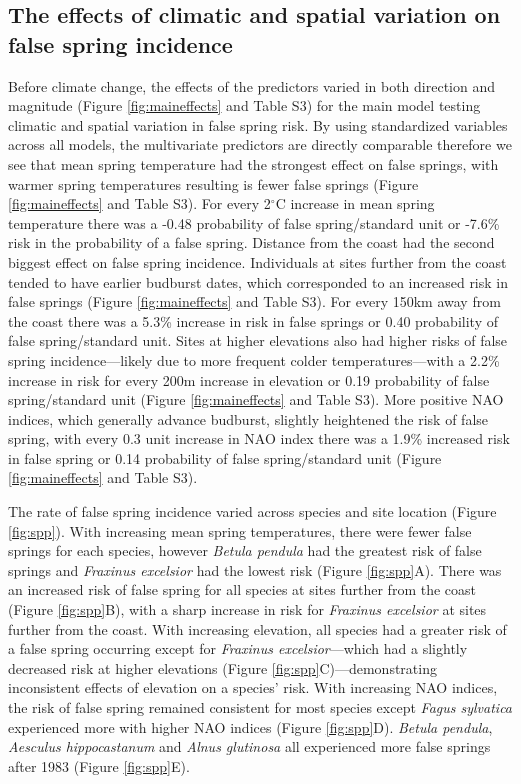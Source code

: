 \documentclass{article}\usepackage[]{graphicx}\usepackage[]{color}
\begin{document}
\subsection*{The effects of climatic and spatial variation on false spring incidence}
Before climate change, the effects of the predictors varied in both direction and magnitude (Figure \ref{fig:maineffects} and Table S3) for the main model testing climatic and spatial variation in false spring risk. By using standardized variables across all models, the multivariate predictors are directly comparable therefore we see that mean spring temperature had the strongest effect on false springs, with warmer spring temperatures resulting is fewer false springs (Figure \ref{fig:maineffects} and Table S3). For every 2$^{\circ}$C increase in mean spring temperature there was a -0.48 probability of false spring/standard unit or -7.6\% risk in the probability of a false spring. Distance from the coast had the second biggest effect on false spring incidence. Individuals at sites further from the coast tended to have earlier budburst dates, which corresponded to an increased risk in false springs (Figure \ref{fig:maineffects} and Table S3). For every 150km away from the coast there was a 5.3\% increase in risk in false springs or 0.40 probability of false spring/standard unit. Sites at higher elevations also had higher risks of false spring incidence---likely due to more frequent colder temperatures---with a 2.2\% increase in risk for every 200m increase in elevation or 0.19 probability of false spring/standard unit (Figure \ref{fig:maineffects} and Table S3). More positive NAO indices, which generally advance budburst, slightly heightened the risk of false spring, with every 0.3 unit increase in NAO index there was a 1.9\% increased risk in false spring or 0.14 probability of false spring/standard unit (Figure \ref{fig:maineffects} and Table S3).  

The rate of false spring incidence varied across species and site location (Figure \ref{fig:spp}). With increasing mean spring temperatures, there were fewer false springs for each species, however \textit{Betula pendula} had the greatest risk of false springs and \textit{Fraxinus excelsior} had the lowest risk (Figure \ref{fig:spp}A). There was an increased risk of false spring for all species at sites further from the coast (Figure \ref{fig:spp}B), with a sharp increase in risk for \textit{Fraxinus excelsior} at sites further from the coast. With increasing elevation, all species had a greater risk of a false spring occurring except for \textit{Fraxinus excelsior}---which had a slightly decreased risk at higher elevations (Figure \ref{fig:spp}C)---demonstrating inconsistent effects of elevation on a species' risk.  With increasing NAO indices, the risk of false spring remained consistent for most species except \textit{Fagus sylvatica} experienced more with higher NAO indices (Figure \ref{fig:spp}D). \textit{Betula pendula}, \textit{Aesculus hippocastanum} and \textit{Alnus glutinosa} all experienced more false springs after 1983 (Figure \ref{fig:spp}E). 
\end{document}
